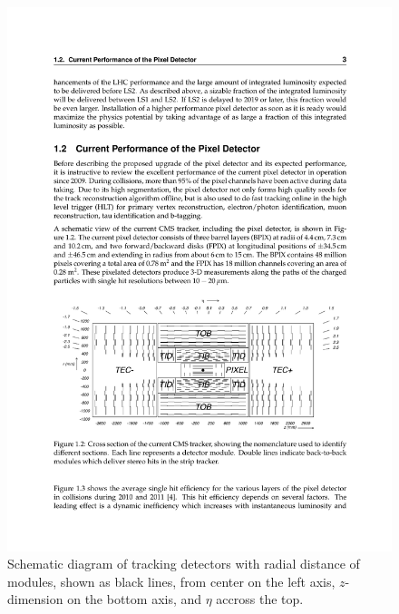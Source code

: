 \begin{figure}[tbh]
\centering
\includegraphics[width=6.5in]{figures/tracker.pdf}
\caption{Schematic diagram of tracking detectors with radial distance of modules, shown as black lines, from center on the left axis, $z$-dimension on the bottom axis, and $\eta$ accross the top.}
\label{fig:tracker}
\end{figure}

